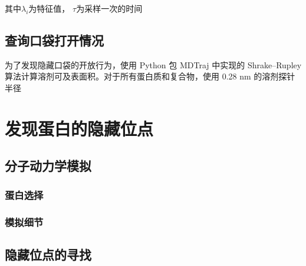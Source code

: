 \documentclass[a4paper]{article}
\begin{document}
\begin{CJK}{UTF8}{gbsn}
其中$\lambda_{i}$为特征值， $\tau$为采样一次的时间



	\subsection{查询口袋打开情况}

为了发现隐藏口袋的开放行为，使用 Python 包 MDTraj 中实现的 Shrake–Rupley 算法计算溶剂可及表面积。对于所有蛋白质和复合物，使用 0.28 nm 的溶剂探针半径




\section{发现蛋白的隐藏位点}
	\subsection{分子动力学模拟}
		\subsubsection{蛋白选择}
		\subsubsection{模拟细节}
	\subsection{隐藏位点的寻找}




\end{CJK}
\end{document}

